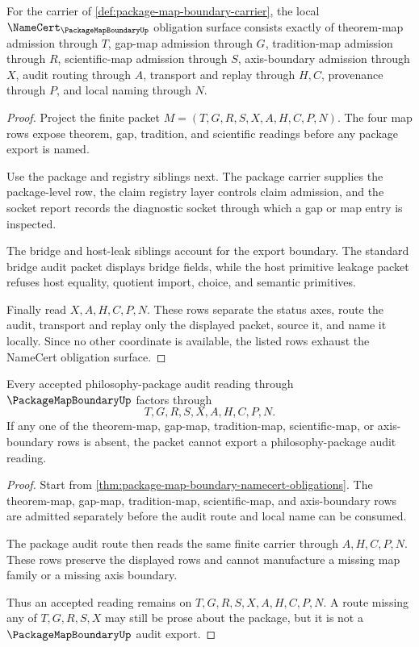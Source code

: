 \begin{theorem}
\label{thm:package-map-boundary-namecert-obligations}
For the carrier of \autoref{def:package-map-boundary-carrier}, the local $\NameCert_{\PackageMapBoundaryUp}$ obligation surface consists exactly of theorem-map admission through $T$, gap-map admission through $G$, tradition-map admission through $R$, scientific-map admission through $S$, axis-boundary admission through $X$, audit routing through $A$, transport and replay through $H,C$, provenance through $P$, and local naming through $N$.
\end{theorem}
\begin{proof}
Project the finite packet $M=(T,G,R,S,X,A,H,C,P,N)$. The four map rows expose theorem, gap, tradition, and scientific readings before any package export is named.

Use the package and registry siblings next. The package carrier supplies the package-level row, the claim registry layer controls claim admission, and the socket report records the diagnostic socket through which a gap or map entry is inspected.

The bridge and host-leak siblings account for the export boundary. The standard bridge audit packet displays bridge fields, while the host primitive leakage packet refuses host equality, quotient import, choice, and semantic primitives.

Finally read $X,A,H,C,P,N$. These rows separate the status axes, route the audit, transport and replay only the displayed packet, source it, and name it locally. Since no other coordinate is available, the listed rows exhaust the NameCert obligation surface.
\end{proof}

\begin{theorem}
\label{thm:package-map-boundary-nonescape}
Every accepted philosophy-package audit reading through $\PackageMapBoundaryUp$ factors through
$$
T,G,R,S,X,A,H,C,P,N.
$$
If any one of the theorem-map, gap-map, tradition-map, scientific-map, or axis-boundary rows is absent, the packet cannot export a philosophy-package audit reading.
\end{theorem}
\begin{proof}
Start from \autoref{thm:package-map-boundary-namecert-obligations}. The theorem-map, gap-map, tradition-map, scientific-map, and axis-boundary rows are admitted separately before the audit route and local name can be consumed.

The package audit route then reads the same finite carrier through $A,H,C,P,N$. These rows preserve the displayed rows and cannot manufacture a missing map family or a missing axis boundary.

Thus an accepted reading remains on $T,G,R,S,X,A,H,C,P,N$. A route missing any of $T,G,R,S,X$ may still be prose about the package, but it is not a $\PackageMapBoundaryUp$ audit export.
\end{proof}

